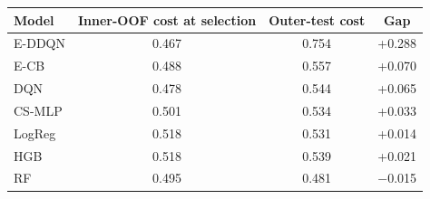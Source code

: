 \begin{tabular}{lccc}
\toprule
Model & Inner-OOF cost at selection & Outer-test cost & Gap \\
\midrule
E-DDQN & 0.467 & 0.754 & +0.288 \\
E-CB & 0.488 & 0.557 & +0.070 \\
DQN & 0.478 & 0.544 & +0.065 \\
CS-MLP & 0.501 & 0.534 & +0.033 \\
LogReg & 0.518 & 0.531 & +0.014 \\
HGB & 0.518 & 0.539 & +0.021 \\
RF & 0.495 & 0.481 & $-$0.015 \\
\bottomrule
\end{tabular}
